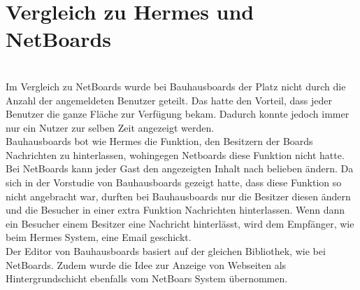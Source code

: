 


















\section{Vergleich zu Hermes und NetBoards}\label{Vergleich zu Hermes und Netboards}
\\
Im Vergleich zu NetBoards wurde bei Bauhausboards der Platz nicht durch die Anzahl der angemeldeten Benutzer geteilt.
Das hatte den Vorteil, dass jeder Benutzer die ganze Fläche zur Verfügung bekam.
Dadurch konnte jedoch immer nur ein Nutzer zur selben Zeit angezeigt werden.
\\
Bauhausboards bot wie Hermes die Funktion, den Besitzern der Boards Nachrichten zu hinterlassen, wohingegen Netboards diese Funktion nicht hatte.
\\
Bei NetBoards kann jeder Gast den angezeigten Inhalt nach belieben ändern.
Da sich in der Vorstudie von Bauhausboards gezeigt hatte, dass diese Funktion so nicht angebracht war, durften bei Bauhausboards nur die Besitzer diesen ändern und die Besucher in einer extra Funktion Nachrichten hinterlassen.
Wenn dann ein Besucher einem Besitzer eine Nachricht hinterlässt, wird dem Empfänger, wie beim Hermes System, eine Email geschickt.
\\
Der Editor von Bauhausboards basiert auf der gleichen Bibliothek, wie bei NetBoards. Zudem wurde die Idee zur Anzeige von Webseiten als Hintergrundschicht ebenfalls vom NetBoars System übernommen.
\\
